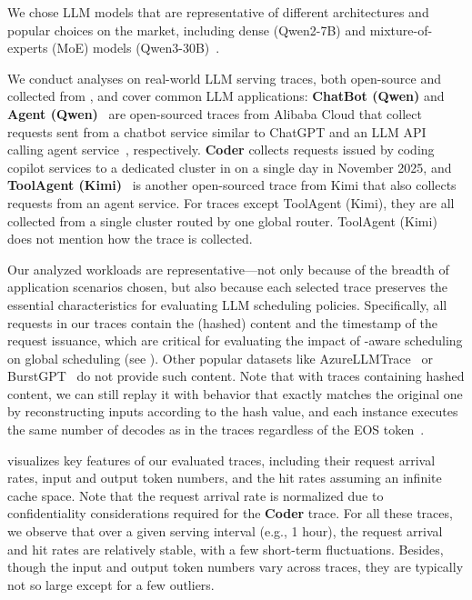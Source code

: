 We chose LLM models that are representative of different architectures and popular choices on the market,
including dense (Qwen2-7B) and mixture-of-experts (MoE) models (Qwen3-30B)~\cite{DBLP:conf/sosp/Xiang0QYZYZL0025}. 

We conduct analyses on real-world LLM serving traces, both open-source and collected from {\company},
and cover common LLM applications:
\textbf{ChatBot (Qwen)} and \textbf{Agent (Qwen)}~\cite{bailian}
are open-sourced traces from Alibaba Cloud that
collect requests sent from a chatbot service similar to ChatGPT and
an LLM API calling agent service~\cite{claudeapi,geminiapi,openaiapi}, respectively.
\textbf{Coder} collects requests issued by coding copilot services to a dedicated cluster
in {\company} on a single day in November 2025, 
and \textbf{ToolAgent (Kimi)}~\cite{mooncake-trace} is another open-sourced trace from Kimi
that also collects requests from an agent service.
For traces except ToolAgent (Kimi),
they are all collected from a single cluster routed by one global router. 
ToolAgent (Kimi) does not mention how the trace is collected. 

Our analyzed workloads are representative---not
only because of the breadth of application scenarios chosen,
but also because each selected trace preserves the essential characteristics for evaluating
LLM scheduling policies.
Specifically, all requests in our traces contain the (hashed) content and the timestamp of the request issuance,
which are critical for evaluating the impact of {\kvcache}-aware scheduling on global scheduling (see \textsection{\ref{sec:kvcache-aware}}).
Other popular datasets like AzureLLMTrace~\cite{AzurePublicDataset} or BurstGPT~\cite{wang2025burstgpt} do not provide
such content.
Note that with traces containing hashed content, 
we can still replay it 
with behavior that exactly matches the original one by
reconstructing inputs according to the hash value,
and each instance executes the same number of decodes as in the traces regardless of the EOS token~\cite{kvcache}.

{} visualizes key features of our evaluated traces,
including their request arrival rates, input and output token numbers,
and the {\kvcache} hit rates assuming an infinite {\kvcache} cache space.
Note that the request arrival rate is normalized due to confidentiality considerations
required for the \textbf{Coder} trace. 
For all these traces, we observe that over a given serving interval (e.g., 1 hour),
the request arrival and {\kvcache} hit rates are relatively stable, with a few short-term fluctuations.
Besides, though the input and output token numbers vary across traces, 
they are typically not so large except for a few outliers. 


